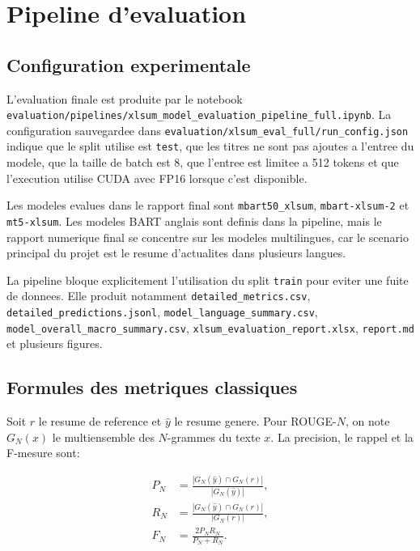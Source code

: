 \section{Pipeline d'evaluation}

\subsection{Configuration experimentale}

L'evaluation finale est produite par le notebook \texttt{evaluation/pipelines/xlsum\_model\_evaluation\_pipeline\_full.ipynb}. La configuration sauvegardee dans \texttt{evaluation/xlsum\_eval\_full/run\_config.json} indique que le split utilise est \texttt{test}, que les titres ne sont pas ajoutes a l'entree du modele, que la taille de batch est 8, que l'entree est limitee a 512 tokens et que l'execution utilise CUDA avec FP16 lorsque c'est disponible.

Les modeles evalues dans le rapport final sont \texttt{mbart50\_xlsum}, \texttt{mbart-xlsum-2} et \texttt{mt5-xlsum}. Les modeles BART anglais sont definis dans la pipeline, mais le rapport numerique final se concentre sur les modeles multilingues, car le scenario principal du projet est le resume d'actualites dans plusieurs langues.

La pipeline bloque explicitement l'utilisation du split \texttt{train} pour eviter une fuite de donnees. Elle produit notamment \texttt{detailed\_metrics.csv}, \texttt{detailed\_predictions.jsonl}, \texttt{model\_language\_summary.csv}, \texttt{model\_overall\_macro\_summary.csv}, \texttt{xlsum\_evaluation\_report.xlsx}, \texttt{report.md} et plusieurs figures.

\subsection{Formules des metriques classiques}

Soit $r$ le resume de reference et $\hat{y}$ le resume genere. Pour ROUGE-$N$, on note $G_N(x)$ le multiensemble des $N$-grammes du texte $x$. La precision, le rappel et la F-mesure sont:

\begin{align}
P_N &= \frac{|G_N(\hat{y}) \cap G_N(r)|}{|G_N(\hat{y})|}, \\
R_N &= \frac{|G_N(\hat{y}) \cap G_N(r)|}{|G_N(r)|}, \\
F_N &= \frac{2 P_N R_N}{P_N + R_N}.
\label{eq:rouge-n}
\end{align}

